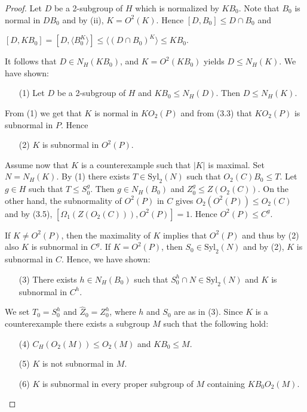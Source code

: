 \documentclass[11pt]{article}
\theoremstyle{plain}
\theoremstyle{stmplain}
\newcommand{\disp}[1]{\begin{center}$\displaystyle #1$\end{center}}
\begin{document}
\begin{proof}
Let $D$ be a 2-subgroup of $H$ which is normalized by $KB_0$. Note that $B_0$ is
normal in $DB_0$ and by (ii), $K = O^2(K)$. Hence $[D, B_0] \le D \cap B_0$ and
\disp{[D, KB_0] = [D, \langle B_0^K \rangle] \le \langle (D \cap B_0)^K \rangle \le KB_0.}
It follows that $D \in N_H(KB_0)$, and $K = O^2(KB_0)$ yields $D \le N_H(K)$. We
have shown:
\begin{enumerate}
\item[(1)] Let $D$ be a 2-subgroup of $H$ and $KB_0 \le N_H(D)$. Then $D \le
  N_H(K)$.
\end{enumerate}
From (1) we get that $K$ is normal in $KO_2(P)$ and from (3.3) that $KO_2(P)$
is subnormal in $P$. Hence
\begin{enumerate}
\item[(2)] $K$ is subnormal in $O^2(P)$.
\end{enumerate}

\smallskip
\noindent Assume now that $K$ is a counterexample such that $|K|$ is maximal. Set
$N = N_H(K)$. By (1) there exists $T \in \mathrm{Syl}_2(N)$ such that
$O_2(C)B_0 \le T$. Let $g \in H$ such that $T \le S_0^g$. Then $g \in
N_H(B_0)$ and $Z_0^g \le Z(O_2(C))$. On the other hand, the subnormality of
$O^2(P)$ in $C$ gives $O_2(O^2(P)) \le O_2(C)$ and by (3.5), $[\Omega_1(Z(O_2(C))),
O^2(P)] = 1$. Hence $O^2(P) \le C^g$.

\smallskip
\noindent If $K \ne O^2(P)$, then the maximality of $K$ implies that $O^2(P)$ and
thus by (2) also $K$ is subnormal in $C^g$. If $K = O^2(P)$, then $S_0 \in
\mathrm{Syl}_2(N)$ and by (2), $K$ is subnormal in $C$. Hence, we have shown:
\begin{enumerate}
\item[(3)] There exists $h \in N_H(B_0)$ such that $S_0^h \cap N \in
  \mathrm{Syl}_2(N)$ and $K$ is subnormal in $C^h$.
\end{enumerate}

\smallskip
\noindent We set $T_0 = S_0^h$ and $\hat{Z}_0 = Z_0^h$, where $h$ and $S_0$ are as
in (3). Since $K$ is a counterexample there exists a subgroup $M$ such that the
following hold:
\begin{enumerate}
\item[(4)] $C_H(O_2(M)) \le O_2(M)$ and $KB_0 \le M$.
\item[(5)] $K$ is not subnormal in $M$.
\item[(6)] $K$ is subnormal in every proper subgroup of $M$ containing
  $KB_0O_2(M)$.
\end{enumerate}


\end{proof}
\end{document}
